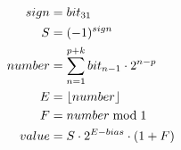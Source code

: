 \begin{equation*}
\begin{aligned}
    sign &= bit_{31} \\
    S &= (-1)^{sign} \\
    number &= \sum_{n=1}^{p+k}{bit_{n-1} \cdot 2^{n-p}} \\
    E &= \lfloor number\rfloor \\
    F &= number \bmod 1 \\
    value &= S \cdot 2^{E-bias} \cdot (1 + F) \\
\end{aligned}
\end{equation*}
